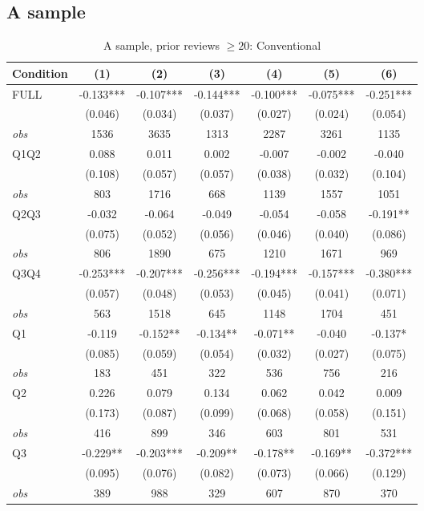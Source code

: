 \subsection{A sample}
\begin{table}[!htbp]
\centering
\caption{A sample, prior reviews $\geq20$: Conventional}
\begin{tabular}{lcccccc}
\toprule
Condition & (1) & (2) & (3) & (4) & (5) & (6) \\
\midrule
FULL & -0.133*** & -0.107*** & -0.144*** & -0.100*** & -0.075*** & -0.251*** \\
 & (0.046) & (0.034) & (0.037) & (0.027) & (0.024) & (0.054) \\
\textit{obs} & 1536 & 3635 & 1313 & 2287 & 3261 & 1135 \\
Q1Q2 & 0.088 & 0.011 & 0.002 & -0.007 & -0.002 & -0.040 \\
 & (0.108) & (0.057) & (0.057) & (0.038) & (0.032) & (0.104) \\
\textit{obs} & 803 & 1716 & 668 & 1139 & 1557 & 1051 \\
Q2Q3 & -0.032 & -0.064 & -0.049 & -0.054 & -0.058 & -0.191** \\
 & (0.075) & (0.052) & (0.056) & (0.046) & (0.040) & (0.086) \\
\textit{obs} & 806 & 1890 & 675 & 1210 & 1671 & 969 \\
Q3Q4 & -0.253*** & -0.207*** & -0.256*** & -0.194*** & -0.157*** & -0.380*** \\
 & (0.057) & (0.048) & (0.053) & (0.045) & (0.041) & (0.071) \\
\textit{obs} & 563 & 1518 & 645 & 1148 & 1704 & 451 \\
Q1 & -0.119 & -0.152** & -0.134** & -0.071** & -0.040 & -0.137* \\
 & (0.085) & (0.059) & (0.054) & (0.032) & (0.027) & (0.075) \\
\textit{obs} & 183 & 451 & 322 & 536 & 756 & 216 \\
Q2 & 0.226 & 0.079 & 0.134 & 0.062 & 0.042 & 0.009 \\
 & (0.173) & (0.087) & (0.099) & (0.068) & (0.058) & (0.151) \\
\textit{obs} & 416 & 899 & 346 & 603 & 801 & 531 \\
Q3 & -0.229** & -0.203*** & -0.209** & -0.178** & -0.169** & -0.372*** \\
 & (0.095) & (0.076) & (0.082) & (0.073) & (0.066) & (0.129) \\
\textit{obs} & 389 & 988 & 329 & 607 & 870 & 370 \\

\end{tabular}
\end{table}
